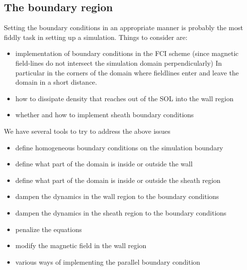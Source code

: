 \subsection{The boundary region} \label{sec:boundary}
Setting the boundary conditions in an appropriate manner is probably the most
fiddly task in setting up a simulation. Things to consider are:
\begin{itemize}
\item implementation of boundary conditions in the FCI scheme (since
    magnetic field-lines do not intersect the simulation domain perpendicularly)
    In particular in the corners of the domain where fieldlines enter and leave
    the domain in a short distance.
\item how to dissipate density that reaches out of the SOL into the wall region
\item whether and how to implement sheath boundary conditions
\end{itemize}
We have several tools to try to address the above issues
\begin{itemize}
    \item define homogeneous boundary conditions on the simulation boundary
    \item define what part of the domain is inside or outside the wall
    \item define what part of the domain is inside or outside the sheath region
    \item dampen the dynamics in the wall region to the boundary conditions
    \item dampen the dynamics in the sheath region to the boundary conditions
    \item penalize the equations
    \item modify the magnetic field in the wall region
    \item various ways of implementing the parallel boundary condition
\end{itemize}
